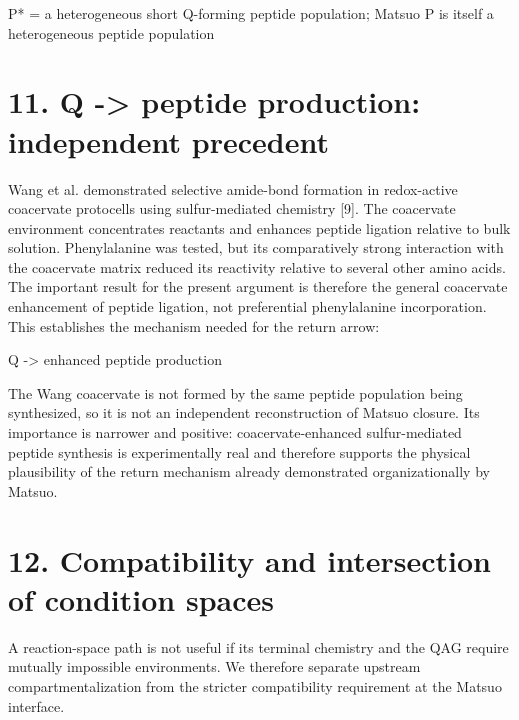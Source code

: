\documentclass[11pt]{article}
\begin{document}
P* = a heterogeneous short Q-forming peptide population; Matsuo P is itself a heterogeneous peptide population

\hypertarget{q---peptide-production-independent-precedent}{%
\section*{11. Q -\textgreater{} peptide production: independent precedent}\label{q---peptide-production-independent-precedent}}

Wang et al. demonstrated selective amide-bond formation in redox-active coacervate protocells using sulfur-mediated chemistry {[}9{]}. The coacervate environment concentrates reactants and enhances peptide ligation relative to bulk solution. Phenylalanine was tested, but its comparatively strong interaction with the coacervate matrix reduced its reactivity relative to several other amino acids. The important result for the present argument is therefore the general coacervate enhancement of peptide ligation, not preferential phenylalanine incorporation. This establishes the mechanism needed for the return arrow:

Q -\textgreater{} enhanced peptide production

The Wang coacervate is not formed by the same peptide population being synthesized, so it is not an independent reconstruction of Matsuo closure. Its importance is narrower and positive: coacervate-enhanced sulfur-mediated peptide synthesis is experimentally real and therefore supports the physical plausibility of the return mechanism already demonstrated organizationally by Matsuo.

\hypertarget{compatibility-and-intersection-of-condition-spaces}{%
\section*{12. Compatibility and intersection of condition spaces}\label{compatibility-and-intersection-of-condition-spaces}}

A reaction-space path is not useful if its terminal chemistry and the QAG require mutually impossible environments. We therefore separate upstream compartmentalization from the stricter compatibility requirement at the Matsuo interface.
\end{document}
